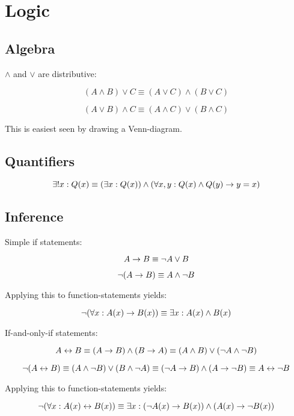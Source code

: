 \section{Logic}

\subsection{Algebra}

$\land$ and $\lor$ are distributive: 

$$ (A \land B) \lor C \equiv (A \lor C) \land (B \lor C)$$

$$ (A \lor B) \land C \equiv (A \land C) \lor (B \land C) $$

This is easiest seen by drawing a Venn-diagram. 

\subsection{Quantifiers}

$$ \exists ! x: Q(x) \equiv ( \exists x: Q(x) ) \land ( \forall x,y: Q(x) \land Q(y) \to y = x ) $$

\subsection{Inference}

Simple if statements: 

$$ A \to B \equiv \lnot A \lor B $$

$$ \lnot (A \to B) \equiv A \land \lnot B$$


Applying this to function-statements yields: 

$$ \lnot ( \forall x: A(x) \to B(x) ) \equiv \exists x: A(x) \land B(x)$$ 

If-and-only-if statements: 

$$ A \leftrightarrow B \equiv (A \to B) \land (B \to A) \equiv (A \land B) \lor (\lnot A \land \lnot B)$$

$$ \lnot (A \leftrightarrow B) \equiv (A \land \lnot B) \lor (B \land \lnot A) \equiv (\lnot A \to B) \land (A \to \lnot B) \equiv A \leftrightarrow \lnot B$$

Applying this to function-statements yields: 

$$ \lnot (\forall x : A(x) \leftrightarrow B(x)) \equiv \exists x : ( \lnot A(x) \to B(x) ) \land ( A(x) \to \lnot B(x) ) $$

